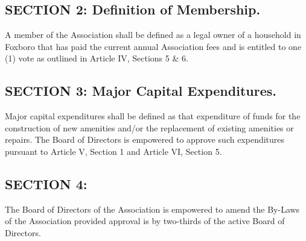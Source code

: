 \subsection{SECTION 2: Definition of Membership.}
A member of the Association shall be defined as a legal owner of a
household in Foxboro that has paid the current annual Association fees and
is entitled to one (1) vote as outlined in Article IV, Sections 5 \& 6.

\subsection{SECTION 3: Major Capital Expenditures.}
Major capital expenditures shall be defined as that expenditure of funds
for the construction of new amenities and/or the replacement of existing
amenities or repairs. The Board of Directors is empowered to approve such
expenditures pursuant to Article V, Section 1 and Article VI, Section 5.

\subsection{SECTION 4:}
The Board of Directors of the Association is empowered to amend the
By-Laws of the Association provided approval is by two-thirds of the
active Board of Directors.


